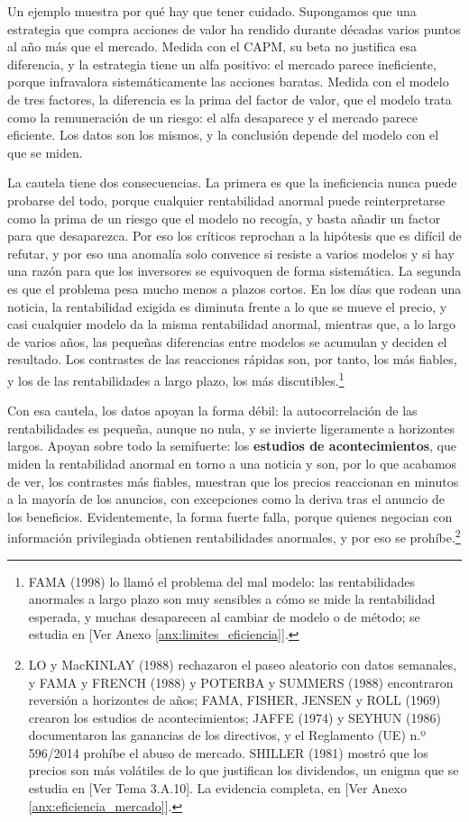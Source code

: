 \documentclass[10pt,a4paper]{article}
\newcommand{\authorfont}[1]{{\fontfamily{EBGaramond-TLF}\selectfont #1}}
\begin{document}
Un ejemplo muestra por qué hay que tener cuidado. Supongamos que una estrategia que compra acciones de valor ha rendido durante décadas varios puntos al año más que el mercado. Medida con el CAPM, su beta no justifica esa diferencia, y la estrategia tiene un alfa positivo: el mercado parece ineficiente, porque infravalora sistemáticamente las acciones baratas. Medida con el modelo de tres factores, la diferencia es la prima del factor de valor, que el modelo trata como la remuneración de un riesgo: el alfa desaparece y el mercado parece eficiente. Los datos son los mismos, y la conclusión depende del modelo con el que se miden.

La cautela tiene dos consecuencias. La primera es que la ineficiencia nunca puede probarse del todo, porque cualquier rentabilidad anormal puede reinterpretarse como la prima de un riesgo que el modelo no recogía, y basta añadir un factor para que desaparezca. Por eso los críticos reprochan a la hipótesis que es difícil de refutar, y por eso una anomalía solo convence si resiste a varios modelos y si hay una razón para que los inversores se equivoquen de forma sistemática. La segunda es que el problema pesa mucho menos a plazos cortos. En los días que rodean una noticia, la rentabilidad exigida es diminuta frente a lo que se mueve el precio, y casi cualquier modelo da la misma rentabilidad anormal, mientras que, a lo largo de varios años, las pequeñas diferencias entre modelos se acumulan y deciden el resultado. Los contrastes de las reacciones rápidas son, por tanto, los más fiables, y los de las rentabilidades a largo plazo, los más discutibles.\footnote{%
    FAMA (1998) lo llamó el problema del mal modelo: las rentabilidades anormales a largo plazo son muy sensibles a cómo se mide la rentabilidad esperada, y muchas desaparecen al cambiar de modelo o de método; se estudia en [\authorfont{Ver Anexo \ref{anx:limites_eficiencia}}].
}

Con esa cautela, los datos apoyan la forma débil: la autocorrelación de las rentabilidades es pequeña, aunque no nula, y se invierte ligeramente a horizontes largos. Apoyan sobre todo la semifuerte: los \textbf{estudios de acontecimientos}, que miden la rentabilidad anormal en torno a una noticia y son, por lo que acabamos de ver, los contrastes más fiables, muestran que los precios reaccionan en minutos a la mayoría de los anuncios, con excepciones como la deriva tras el anuncio de los beneficios. Evidentemente, la forma fuerte falla, porque quienes negocian con información privilegiada obtienen rentabilidades anormales, y por eso se prohíbe.\footnote{%
    LO y MacKINLAY (1988) rechazaron el paseo aleatorio con datos semanales, y FAMA y FRENCH (1988) y POTERBA y SUMMERS (1988) encontraron reversión a horizontes de años; FAMA, FISHER, JENSEN y ROLL (1969) crearon los estudios de acontecimientos; JAFFE (1974) y SEYHUN (1986) documentaron las ganancias de los directivos, y el Reglamento (UE) n.º 596/2014 prohíbe el abuso de mercado. SHILLER (1981) mostró que los precios son más volátiles de lo que justifican los dividendos, un enigma que se estudia en [\authorfont{Ver Tema 3.A.10}]. La evidencia completa, en [\authorfont{Ver Anexo \ref{anx:eficiencia_mercado}}].
} 
\end{document}
